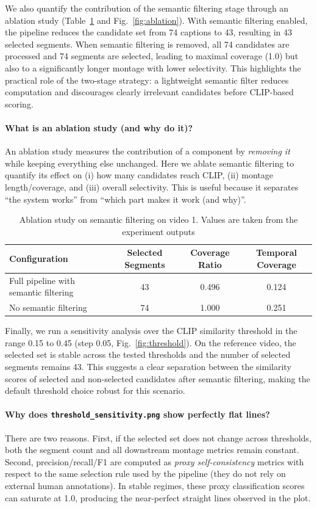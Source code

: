 \documentclass[conference,compsoc]{IEEEtran}
\begin{document}
We also quantify the contribution of the semantic filtering stage through an ablation study (Table~\ref{tab:ablation} and Fig.~\ref{fig:ablation}). With semantic filtering enabled, the pipeline reduces the candidate set from 74 captions to 43, resulting in 43 selected segments. When semantic filtering is removed, all 74 candidates are processed and 74 segments are selected, leading to maximal coverage (1.0) but also to a significantly longer montage with lower selectivity. This highlights the practical role of the two-stage strategy: a lightweight semantic filter reduces computation and discourages clearly irrelevant candidates before CLIP-based scoring.

\paragraph{What is an ablation study (and why do it)?}
An ablation study measures the contribution of a component by \emph{removing it} while keeping everything else unchanged. Here we ablate semantic filtering to quantify its effect on (i) how many candidates reach CLIP, (ii) montage length/coverage, and (iii) overall selectivity. This is useful because it separates ``the system works'' from ``which part makes it work (and why)''.

\begin{table}[t]
\centering
\caption{Ablation study on semantic filtering on video 1. Values are taken from the experiment outputs}
\label{tab:ablation}
\begin{tabular}{lccc}
\toprule
Configuration & Selected Segments & Coverage Ratio & Temporal Coverage \\
\midrule
Full pipeline with semantic filtering & 43 & 0.496 & 0.124 \\
No semantic filtering & 74 & 1.000 & 0.251 \\
\bottomrule
\end{tabular}
\end{table}


Finally, we run a sensitivity analysis over the CLIP similarity threshold in the range 0.15 to 0.45 (step 0.05, Fig.~\ref{fig:threshold}). On the reference video, the selected set is stable across the tested thresholds and the number of selected segments remains 43. This suggests a clear separation between the similarity scores of selected and non-selected candidates after semantic filtering, making the default threshold choice robust for this scenario.

\paragraph{Why does \texttt{threshold\_sensitivity.png} show perfectly flat lines?}
There are two reasons. First, if the selected set does not change across thresholds, both the segment count and all downstream montage metrics remain constant. Second, precision/recall/F1 are computed as \emph{proxy self-consistency} metrics with respect to the same selection rule used by the pipeline (they do not rely on external human annotations). In stable regimes, these proxy classification scores can saturate at 1.0, producing the near-perfect straight lines observed in the plot.
\end{document}
